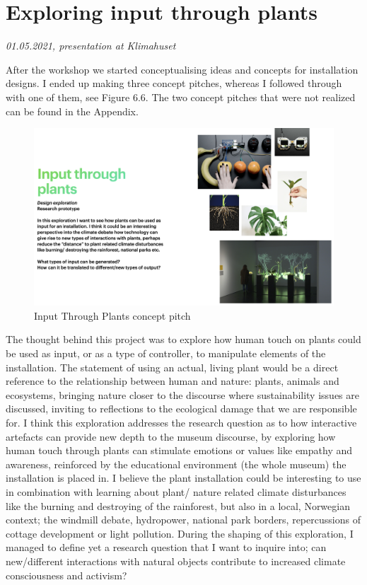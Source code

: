 \break
\section{Exploring input through plants}
\par
\emph{01.05.2021, presentation at Klimahuset}
\par

After the workshop we started conceptualising ideas and concepts for installation designs. I ended up making three concept pitches, whereas I followed through with one of them, see Figure 6.6. The two concept pitches that were not realized can be found in the Appendix. 

\begin{figure}[H]
\centering 
\includegraphics[width=13cm]{pictures/process/plant_pitch.png}
\caption{Input Through Plants concept pitch}
\end{figure}

The thought behind this project was to explore how human touch on plants could be used as input, or as a type of controller, to manipulate elements of the installation. The statement of using an actual, living plant would be a direct reference to the relationship between human and nature: plants, animals and ecosystems, bringing nature closer to the discourse where sustainability issues are discussed, inviting to reflections to the ecological damage that we are responsible for. I think this exploration addresses the research question as to how interactive artefacts can provide new depth to the museum discourse, by exploring how human touch through plants can stimulate emotions or values like empathy and awareness, reinforced by the educational environment (the whole museum) the installation is placed in. I believe the plant installation could be interesting to use in combination with learning about plant/ nature related climate disturbances like the burning and destroying of the rainforest, but also in a local, Norwegian context; the windmill debate, hydropower, national park borders, repercussions of cottage development or light pollution. During the shaping of this exploration, I managed to define yet a research question that I want to inquire into; can new/different interactions with natural objects contribute to increased climate consciousness and activism?	

